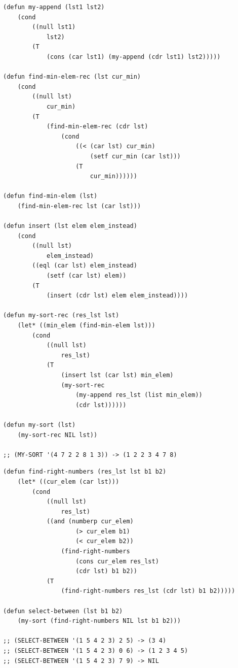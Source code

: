 \documentclass[a4paper,14pt, unknownkeysallowed]{extreport}
\begin{document}
\clearpage

\begin{center}
\captionsetup{justification=raggedright,singlelinecheck=off}
\begin{lstlisting}[label=lst:parallel_processing,caption=my-sort]
(defun my-append (lst1 lst2)
	(cond 
		((null lst1)
			lst2)
		(T 
			(cons (car lst1) (my-append (cdr lst1) lst2)))))

(defun find-min-elem-rec (lst cur_min)
	(cond 
		((null lst)
			cur_min)
		(T 
			(find-min-elem-rec (cdr lst) 
				(cond 
					((< (car lst) cur_min)
						(setf cur_min (car lst)))
					(T 
						cur_min))))))

(defun find-min-elem (lst)
	(find-min-elem-rec lst (car lst)))

(defun insert (lst elem elem_instead)
	(cond 
		((null lst)
			elem_instead)
		((eql (car lst) elem_instead)
			(setf (car lst) elem))
		(T 
			(insert (cdr lst) elem elem_instead))))

(defun my-sort-rec (res_lst lst)
	(let* ((min_elem (find-min-elem lst)))
		(cond 
			((null lst)
				res_lst)
			(T 
				(insert lst (car lst) min_elem)
				(my-sort-rec 
					(my-append res_lst (list min_elem))
					(cdr lst))))))

(defun my-sort (lst)
	(my-sort-rec NIL lst))

;; (MY-SORT '(4 7 2 2 8 1 3)) -> (1 2 2 3 4 7 8)
\end{lstlisting}
\end{center}
	
\begin{center}
\captionsetup{justification=raggedright,singlelinecheck=off}
\begin{lstlisting}[label=lst:parallel_processing,caption=Решение задания 5]
(defun find-right-numbers (res_lst lst b1 b2)
    (let* ((cur_elem (car lst)))
        (cond
            ((null lst)
                res_lst)
            ((and (numberp cur_elem) 
                    (> cur_elem b1)
                    (< cur_elem b2))
                (find-right-numbers 
                    (cons cur_elem res_lst)
                    (cdr lst) b1 b2))
            (T 
                (find-right-numbers res_lst (cdr lst) b1 b2)))))

(defun select-between (lst b1 b2)
    (my-sort (find-right-numbers NIL lst b1 b2)))

;; (SELECT-BETWEEN '(1 5 4 2 3) 2 5) -> (3 4)
;; (SELECT-BETWEEN '(1 5 4 2 3) 0 6) -> (1 2 3 4 5)
;; (SELECT-BETWEEN '(1 5 4 2 3) 7 9) -> NIL
\end{lstlisting}
\end{center}
\end{document}
